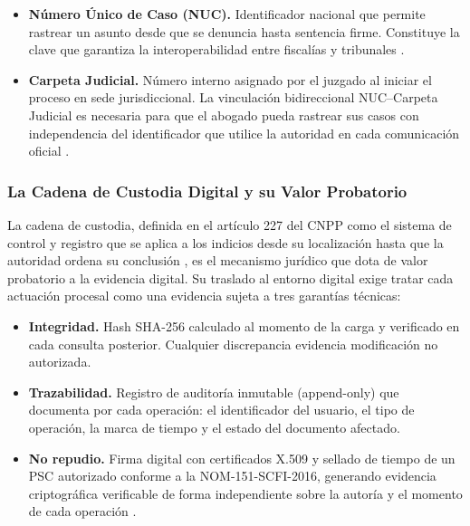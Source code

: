 \begin{itemize}
  \item \textbf{Número Único de Caso (NUC).} Identificador nacional que permite rastrear un asunto desde que se denuncia hasta sentencia firme. Constituye la clave que garantiza la interoperabilidad entre fiscalías y tribunales \cite{cnpp2021}.

  \item \textbf{Carpeta Judicial.} Número interno asignado por el juzgado al iniciar el proceso en sede jurisdiccional. La vinculación bidireccional NUC--Carpeta Judicial es necesaria para que el abogado pueda rastrear sus casos con independencia del identificador que utilice la autoridad en cada comunicación oficial \cite{pjcdmx2023}.
\end{itemize}

\subsubsection{La Cadena de Custodia Digital y su Valor Probatorio}

La cadena de custodia, definida en el artículo 227 del CNPP como el sistema de control y registro que se aplica a los indicios desde su localización hasta que la autoridad ordena su conclusión \cite{cnpp2021}, es el mecanismo jurídico que dota de valor probatorio a la evidencia digital. Su traslado al entorno digital exige tratar cada actuación procesal como una evidencia sujeta a tres garantías técnicas:

\begin{itemize}
  \item \textbf{Integridad.} Hash SHA-256 calculado al momento de la carga y verificado en cada consulta posterior. Cualquier discrepancia evidencia modificación no autorizada.

  \item \textbf{Trazabilidad.} Registro de auditoría inmutable (append-only) que documenta por cada operación: el identificador del usuario, el tipo de operación, la marca de tiempo y el estado del documento afectado.

  \item \textbf{No repudio.} Firma digital con certificados X.509 y sellado de tiempo de un PSC autorizado conforme a la NOM-151-SCFI-2016, generando evidencia criptográfica verificable de forma independiente sobre la autoría y el momento de cada operación \cite{cnpp2021,nom151_2016}.
\end{itemize}

